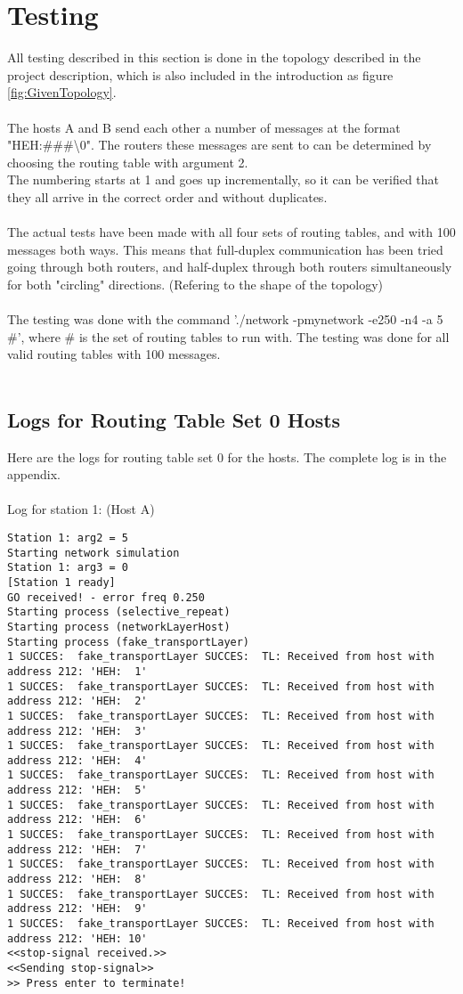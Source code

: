 \section{Testing}
All testing described in this section is done in the topology described in the project description, which is also included in the introduction as figure \ref{fig:GivenTopology}.\\
\\
The hosts A and B send each other a number of messages at the format "HEH:\#\#\#\textbackslash0". The routers these messages are sent to can be determined by choosing the routing table with argument 2.\\
The numbering starts at 1 and goes up incrementally, so it can be verified that they all arrive in the correct order and without duplicates.\\
\\
The actual tests have been made with all four sets of routing tables, and with 100 messages both ways. This means that full-duplex communication has been tried going through both routers, and half-duplex through both routers simultaneously for both "circling" directions. (Refering to the shape of the topology)\\
\\
The testing was done with the command './network -pmynetwork -e250 -n4 -a 5 \#', where \# is the set of routing tables to run with. The testing was done for all valid routing tables with 100 messages.\\
\\
\subsection{Logs for Routing Table Set 0 Hosts}
Here are the logs for routing table set 0 for the hosts. The complete log is in the appendix.\\
\\
Log for station 1: (Host A)
\begin{Verbatim}[frame=single]
Station 1: arg2 = 5
Starting network simulation
Station 1: arg3 = 0
[Station 1 ready]
GO received! - error freq 0.250
Starting process (selective_repeat)
Starting process (networkLayerHost)
Starting process (fake_transportLayer)
1 SUCCES:  fake_transportLayer SUCCES:  TL: Received from host with address 212: 'HEH:  1'
1 SUCCES:  fake_transportLayer SUCCES:  TL: Received from host with address 212: 'HEH:  2'
1 SUCCES:  fake_transportLayer SUCCES:  TL: Received from host with address 212: 'HEH:  3'
1 SUCCES:  fake_transportLayer SUCCES:  TL: Received from host with address 212: 'HEH:  4'
1 SUCCES:  fake_transportLayer SUCCES:  TL: Received from host with address 212: 'HEH:  5'
1 SUCCES:  fake_transportLayer SUCCES:  TL: Received from host with address 212: 'HEH:  6'
1 SUCCES:  fake_transportLayer SUCCES:  TL: Received from host with address 212: 'HEH:  7'
1 SUCCES:  fake_transportLayer SUCCES:  TL: Received from host with address 212: 'HEH:  8'
1 SUCCES:  fake_transportLayer SUCCES:  TL: Received from host with address 212: 'HEH:  9'
1 SUCCES:  fake_transportLayer SUCCES:  TL: Received from host with address 212: 'HEH: 10'
<<stop-signal received.>>
<<Sending stop-signal>>
>> Press enter to terminate!
\end{Verbatim}

